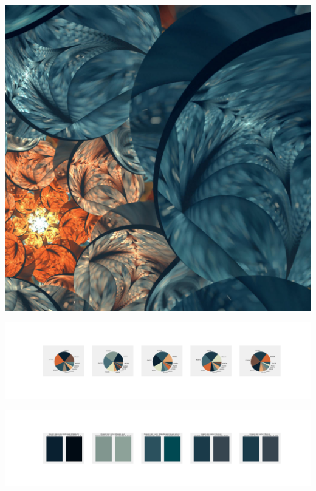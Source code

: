 \documentclass[11pt]{article}
\begin{document}
\begin{landscape}
    \begin{center}
    \includegraphics[width=\textwidth]{./nbimg/file (350).jpg}
    \end{center}

    \begin{center}
    \includegraphics[width=250mm]{./nbimg/pie-279.jpg}
    \end{center}

    \begin{center}
    \includegraphics[width=250mm]{./nbimg/peak-279.jpg}
    \end{center}
    


\end{landscape}
\end{document}
